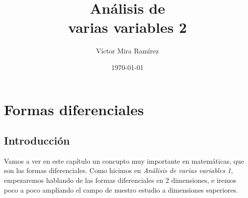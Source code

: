\documentclass{report}
\title{\Huge{Análisis de\\ varias variables 2}}
\author{\huge{Víctor Mira Ramírez}}
\date{\today}
\begin{document}
\maketitle
\newpage
\tableofcontents
\pagebreak

\chapter{Formas diferenciales}
  \section*{Introducción}
    \noindent Vamos a ver en este capítulo un concupto muy importante en matemáticas, que son las formas diferenciales. Como hicimos en \textit{Análisis de varias variables 1}, empezaremos hablando de las formas diferenciales en 2 dimensiones, e iremos poco a poco ampliando el campo de nuestro estudio a dimensiones superiores.
\end{document}
